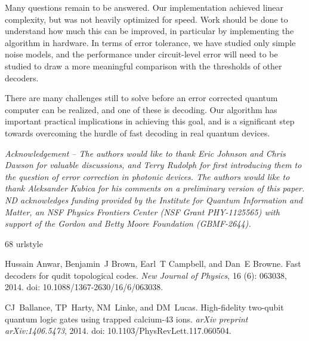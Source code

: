 \documentclass[a4paper, 10pt, accepted=2021-11-03]{quantumarticle}
\begin{document}
{\medskip
Many questions remain to be answered. Our implementation achieved linear complexity, but was not heavily optimized for speed. Work should be done to understand how much this can be improved, in particular by implementing the algorithm in hardware. In terms of error tolerance, we have studied only simple noise models, and the performance under circuit-level error will need to be studied to draw a more meaningful comparison with the thresholds of other decoders. 

\medskip
There are many challenges still to solve before an error corrected quantum computer can be realized, and one of these is decoding. Our algorithm has important practical implications in achieving this goal, and is a significant step towards overcoming the hurdle of fast decoding in real quantum devices. 

\medskip
{\em Acknowledgement -- The authors would like to thank 
Eric Johnson and Chris Dawson for valuable discussions, and 
Terry Rudolph for first introducing them to the question of 
error correction in photonic devices. The authors would like to 
thank Aleksander Kubica for his comments on a preliminary 
version of this paper.
ND acknowledges funding provided by the Institute for Quantum Information and Matter, an NSF Physics Frontiers Center (NSF Grant PHY-1125565) with support of the
Gordon and Betty Moore Foundation (GBMF-2644).}


%
%

\newcommand{\SortNoop}[1]{}
\begin{thebibliography}{68}
\providecommand{\natexlab}[1]{#1}
\providecommand{\url}[1]{\texttt{#1}}
\expandafter\ifx\csname urlstyle\endcsname\relax
  \providecommand{\doi}[1]{doi: #1}\else
  \providecommand{\doi}{doi: \begingroup \urlstyle{rm}\Url}\fi

Hussain Anwar, Benjamin~J Brown, Earl~T Campbell, and Dan~E Browne.
\newblock Fast decoders for qudit topological codes.
\newblock \emph{New Journal of Physics}, 16 (6): 063038,
  2014.
\newblock \doi{10.1088/1367-2630/16/6/063038}.

CJ~Ballance, TP~Harty, NM~Linke, and DM~Lucas.
\newblock High-fidelity two-qubit quantum logic gates using trapped calcium-43
  ions.
\newblock \emph{arXiv preprint arXiv:1406.5473}, 2014.
\newblock \doi{10.1103/PhysRevLett.117.060504}.


\end{thebibliography}}
\end{document}
